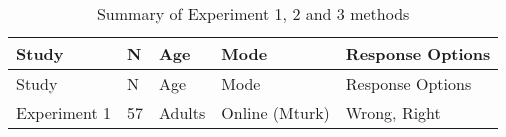 \documentclass[
  english,
  ,man,floatsintext]{apa6}
\begin{document}
\begin{longtable}[]{@{}lllll@{}}
\caption{\label{tab:study1info}Summary of Experiment 1, 2 and 3 methods}\tabularnewline
\toprule
\begin{minipage}[b]{0.16\columnwidth}\raggedright
Study\strut
\end{minipage} & \begin{minipage}[b]{0.01\columnwidth}\raggedright
N\strut
\end{minipage} & \begin{minipage}[b]{0.17\columnwidth}\raggedright
Age\strut
\end{minipage} & \begin{minipage}[b]{0.17\columnwidth}\raggedright
Mode\strut
\end{minipage} & \begin{minipage}[b]{0.34\columnwidth}\raggedright
Response Options\strut
\end{minipage}\tabularnewline
\midrule
\endfirsthead
\toprule
\begin{minipage}[b]{0.16\columnwidth}\raggedright
Study\strut
\end{minipage} & \begin{minipage}[b]{0.01\columnwidth}\raggedright
N\strut
\end{minipage} & \begin{minipage}[b]{0.17\columnwidth}\raggedright
Age\strut
\end{minipage} & \begin{minipage}[b]{0.17\columnwidth}\raggedright
Mode\strut
\end{minipage} & \begin{minipage}[b]{0.34\columnwidth}\raggedright
Response Options\strut
\end{minipage}\tabularnewline
\midrule
\endhead
\begin{minipage}[t]{0.16\columnwidth}\raggedright
Experiment 1\strut
\end{minipage} & \begin{minipage}[t]{0.01\columnwidth}\raggedright
57\strut
\end{minipage} & \begin{minipage}[t]{0.17\columnwidth}\raggedright
Adults\strut
\end{minipage} & \begin{minipage}[t]{0.17\columnwidth}\raggedright
Online (Mturk)\strut
\end{minipage} & \begin{minipage}[t]{0.34\columnwidth}\raggedright
Wrong, Right\strut

\end{minipage}
\end{longtable}
\end{document}
